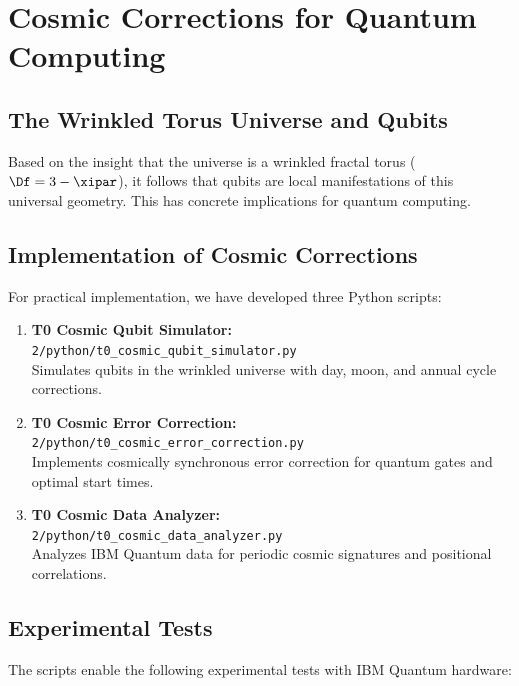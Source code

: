 \section{Cosmic Corrections for Quantum Computing}
\label{sec:cosmic_corrections}

\subsection{The Wrinkled Torus Universe and Qubits}

Based on the insight that the universe is a wrinkled fractal torus
($\Df = 3 - \xipar$), it follows that qubits are local manifestations of this
universal geometry. This has concrete implications for quantum computing.

\subsection{Implementation of Cosmic Corrections}

For practical implementation, we have developed three Python scripts:

\begin{enumerate}
	\item \textbf{T0 Cosmic Qubit Simulator:} \\
	\texttt{2/python/t0\_cosmic\_qubit\_simulator.py} \\
	Simulates qubits in the wrinkled universe with day, moon, and annual cycle corrections.
	
	\item \textbf{T0 Cosmic Error Correction:} \\
	\texttt{2/python/t0\_cosmic\_error\_correction.py} \\
	Implements cosmically synchronous error correction for quantum gates and optimal start times.
	
	\item \textbf{T0 Cosmic Data Analyzer:} \\
	\texttt{2/python/t0\_cosmic\_data\_analyzer.py} \\
	Analyzes IBM Quantum data for periodic cosmic signatures and positional correlations.
\end{enumerate}

\subsection{Experimental Tests}

The scripts enable the following experimental tests with IBM Quantum hardware:

